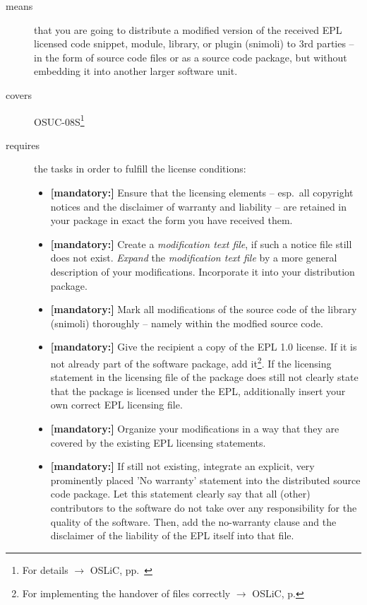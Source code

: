 \begin{description}
\item[means] that you are going to distribute a modified version of the received
EPL licensed code snippet, module, library, or plugin (snimoli) to 3rd parties
-- in the form of source code files or as a source code package, but without
embedding it into another larger software unit.
\item[covers] OSUC-08S\footnote{For details $\rightarrow$ OSLiC, pp.\
\pageref{OSUC-08S-DEF}} \item[requires] the tasks in order to fulfill the
license conditions:
\begin{itemize}

  \item \textbf{[mandatory:]} Ensure that the licensing elements -- esp.\ all
  copyright notices and the disclaimer of warranty and liability -- are retained
  in your package in exact the form you have received them.

  \item \textbf{[mandatory:]} Create a \emph{modification text file}, if such a
  notice file still does not exist. \emph{Expand} the \emph{modification text
  file} by a more general description of your modifications. Incorporate it into
  your distribution package.

  \item \textbf{[mandatory:]} Mark all modifications of the source code of the
  library (snimoli) thoroughly -- namely within
  the modfied source code.
  
  \item \textbf{[mandatory:]} Give the recipient a copy of the EPL 1.0 license.
  If it is not already part of the software package, add it\footnote{For
  implementing the handover of files correctly $\rightarrow$ OSLiC, p.
  \pageref{DistributingFilesHint}}. If the licensing statement in the licensing
  file of the package does still not clearly state that the package is licensed
  under the EPL, additionally insert your own correct EPL licensing file.
  
  \item \textbf{[mandatory:]} Organize your modifications in a way that they are
  covered by the existing EPL licensing statements.
  
  \item \textbf{[mandatory:]} If still not existing, integrate an explicit, very
  prominently placed 'No warranty' statement into the distributed source code
  package. Let this statement clearly say that all (other) contributors to the
  software do not take over any responsibility for the quality of the software.
  Then, add the no-warranty clause and the disclaimer of the liability of the
  EPL itself into that file.
  

\end{itemize}
\end{description}
